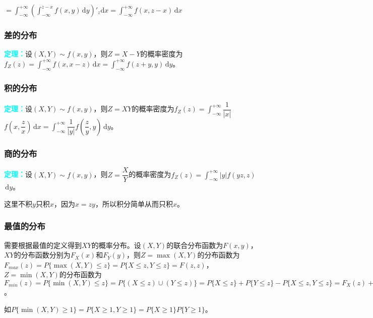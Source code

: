 $=\int_{-\infty}^{+\infty}(\int_{-\infty}^{z-x}f(x,y)\,\textrm{d}y)'_z\textrm{d}x=\int_{-\infty}^{+\infty}f(x,z-x)\,\textrm{d}x$

\subsubsection{差的分布}

\textcolor{aqua}{\textbf{定理：}}设$(X,Y)\sim f(x,y)$，则$Z=X-Y$的概率密度为$f_Z(z)=\int_{-\infty}^{+\infty}f(x,x-z)\,\textrm{d}x=\int_{-\infty}^{+\infty}f(z+y,y)\,\textrm{d}y$。

\subsubsection{积的分布}

\textcolor{aqua}{\textbf{定理：}}设$(X,Y)\sim f(x,y)$，则$Z=XY$的概率密度为$f_Z(z)=\displaystyle{\int_{-\infty}^{+\infty}}\dfrac{1}{\vert x\vert}$\\$f\left(x,\dfrac{z}{x}\right)\,\textrm{d}x=\displaystyle{\int_{-\infty}^{+\infty}}\dfrac{1}{\vert y\vert}f\left(\dfrac{z}{y},y\right)\,\textrm{d}y$。

\subsubsection{商的分布}

\textcolor{aqua}{\textbf{定理：}}设$(X,Y)\sim f(x,y)$，则$Z=\dfrac{X}{Y}$的概率密度为$f_Z(z)=\displaystyle{\int_{-\infty}^{+\infty}}\vert y\vert f(yz,z)$\\$\,\textrm{d}y$。

这里不积$y$只积$x$，因为$x=zy$，所以积分简单从而只积$x$。

\subsubsection{最值的分布}

需要根据最值的定义得到$XY$的概率分布。设$(X,Y)$的联合分布函数为$F(x,y)$，$XY$的分布函数分别为$F_X(x)$和$F_Y(y)$，则$Z=\max(X,Y)$的分布函数为$F_{max}(z)=P\{\max(X,Y)\leqslant z\}=P\{X\leqslant z,Y\leqslant z\}=F(z,z)$，$Z=\min(X,Y)$的分布函数为$F_{min}(z)=P\{\min(X,Y)\leqslant z\}=P\{(X\leqslant z)\cup(Y\leqslant z)\}=P\{X\leqslant z\}+P\{Y\leqslant z\}-P\{X\leqslant z,Y\leqslant z\}=F_X(z)+F_Y(z)-F(z,z)$。

如$P\{\min(X,Y)\geqslant 1\}=P\{X\geqslant1,Y\geqslant1\}=P\{X\geqslant1\}P\{Y\geqslant1\}$。

